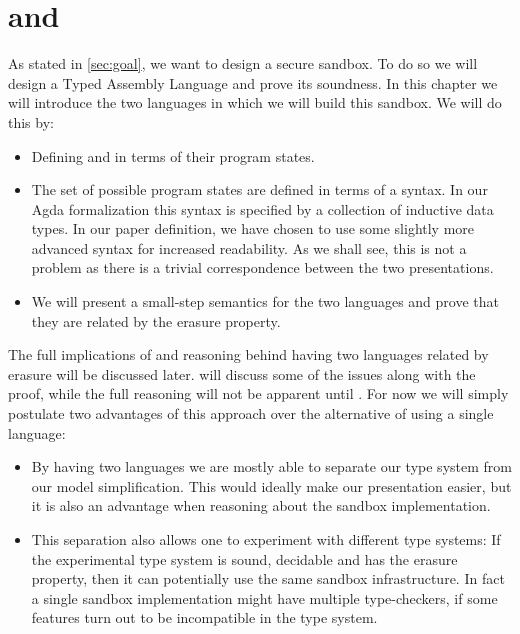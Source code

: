 \chapter{\ATAL and \ATALe}
\label{chap:lang}

As stated in \cref{sec:goal}, we want to design a secure sandbox. To do so we
will design a Typed Assembly Language and prove its soundness. In this chapter
we will introduce the two languages in which we will build this sandbox. We will
do this by:

\begin{itemize}
\item Defining \ATAL and \ATALe in terms of their program states.
\item The set of possible program states are defined in terms of a syntax. In
  our Agda formalization this syntax is specified by a collection of inductive
  data types. In our paper definition, we have chosen to use some slightly more
  advanced syntax for increased readability. As we shall see, this is not a
  problem as there is a trivial correspondence between the two presentations.
\item We will present a small-step semantics for the two languages and prove
  that they are related by the erasure property.
\end{itemize}

The full implications of and reasoning behind having two languages related by
erasure will be discussed later.  will discuss some of the
issues along with the proof, while the full reasoning will not be apparent until
. For now we will simply postulate two advantages of this
approach over the alternative of using a single language:

\begin{itemize}
\item By having two languages we are mostly able to separate our type system
  from our model simplification. This would ideally make our presentation
  easier, but it is also an advantage when reasoning about the sandbox
  implementation.
\item This separation also allows one to experiment with different type systems:
  If the experimental type system is sound, decidable and has the erasure
  property, then it can potentially use the same sandbox infrastructure. In fact
  a single sandbox implementation might have multiple type-checkers, if some
  features turn out to be incompatible in the type system.
\end{itemize}

